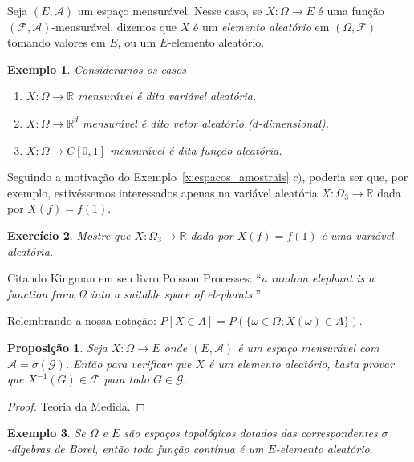 \documentclass[reqno, draft]{book}
\newcommand*\1{\mathds{1}}
\newtheorem{proposition}[theorem]{Proposição}
\newtheorem{example}{Exemplo}[section]
\newtheorem{exercise}[example]{Exercício}
\begin{document}
Seja $(E,\mathcal{A})$ um espaço mensurável.
Nesse caso, se $X: \Omega \to E$ é uma função $(\mathcal{F}, \mathcal{A})$-mensurável, dizemos que $X$ é um \emph{elemento aleatório}  em $(\Omega, \mathcal{F})$ tomando valores em $E$, ou um $E$-elemento aleatório.

\begin{example} Consideramos os casos
  \begin{enumerate}[\quad a)]
  \item $X:\Omega \to \mathbb{R}$ mensurável é dita variável aleatória. 
  \item $X:\Omega \to \mathbb{R}^d$ mensurável é dito vetor aleatório ($d$-dimensional).
  \item $X:\Omega \to C[0,1]$ mensurável é dita função aleatória.
  \end{enumerate}
\end{example}
Seguindo a motivação do Exemplo~\ref{x:espacos_amostrais} $c)$, poderia ser que, por exemplo, estivéssemos interessados apenas na variável aleatória $X:\Omega_3 \to \mathbb{R}$ dada por $X(f) = f(1)$.

\begin{exercise}
  Mostre que $X:\Omega_3 \to \mathbb{R}$ dada por $X(f) = f(1)$ é uma variável aleatória.
\end{exercise}

Citando Kingman em seu livro Poisson Processes: ``\emph{a random elephant is a function from $\Omega$ into a suitable space of elephants.}''

Relembrando a nossa notação: $P[X \in A] = P(\{\omega \in \Omega; X(\omega) \in A\})$.

\begin{proposition}
  Seja $X:\Omega \to E$ onde $(E, \mathcal{A})$ é um espaço mensurável com $\mathcal{A} = \sigma(\mathcal{G})$.
  Então para verificar que $X$ é um elemento aleatório, basta provar que $X^{-1}(G) \in \mathcal{F}$ para todo $G \in \mathcal{G}$.
\end{proposition}

\begin{proof}
  Teoria da Medida.
\end{proof}

\begin{example}
  Se $\Omega$ e $E$ são espaços topológicos dotados das correspondentes $\sigma$-álgebras de Borel, então toda função contínua é um $E$-elemento aleatório.
\end{example}
\end{document}
